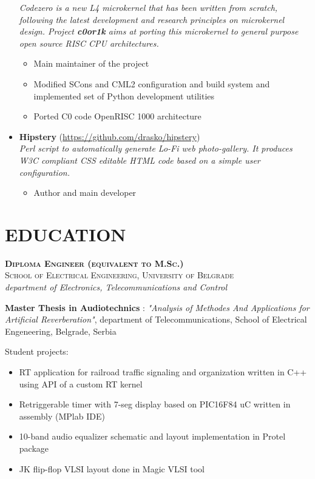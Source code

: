 \documentclass[a4paper, oneside, final]{scrartcl}
\begin{document}
\begin{itemize}
         \textit{Codezero is a new L4 microkernel that has been written from scratch,
            following the latest development and research principles on
               microkernel design. Project \textbf{c0or1k} aims at porting this
               microkernel to general purpose open source RISC CPU
               architectures.}
      \begin{itemize}
         \item Main maintainer of the project 
         \item Modified SCons and CML2 configuration and build system and implemented set of
               Python development utilities
         \item Ported C0 code OpenRISC 1000 architecture
   \end{itemize}
   \item \textbf{Hipstery} (\url{https://github.com/drasko/hipstery}) \\
      \textit{Perl script to automatically generate Lo-Fi web photo-gallery. It
         produces W3C compliant CSS editable HTML code based on a simple user configuration.} 
      \begin{itemize}
         \item Author and main developer 
   \end{itemize}
\end{itemize}


\section{EDUCATION}

   \textbf{\textsc{Diploma Engineer (equivalent to M.Sc.)}} \\
   \textsc{School of Electrical Engineering, University of Belgrade} \\
   \textit{department of Electronics, Telecommunications and Control}

   \textbf{Master Thesis in Audiotechnics} : \textit{"Analysis of Methodes And 
         Applications for Artificial Reverberation"}, department of 
         Telecommunications, School of Electrical Engeneering, Belgrade, Serbia

\medskip
   
   Student projects:

\begin{itemize}
   \item RT application for railroad traffic signaling 
            and organization written in C++ using API of a custom RT kernel
   \item Retriggerable timer with 7-seg display 
            based on PIC16F84 uC written in assembly (MPlab IDE)
   \item 10-band audio equalizer schematic and 
            layout implementation in Protel package
   \item JK flip-flop VLSI layout done in Magic VLSI tool
\end{itemize}
\end{document}
